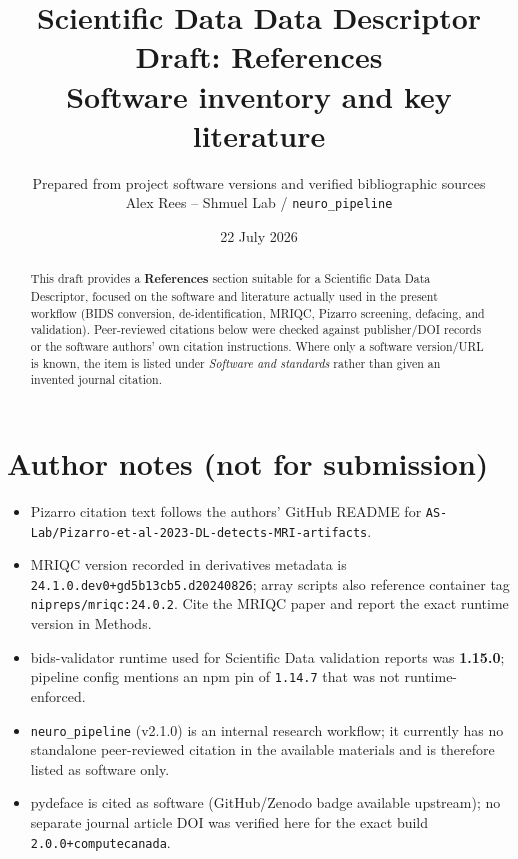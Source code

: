 \documentclass[11pt,letterpaper]{article}
\title{Scientific Data Data Descriptor\\[0.35em]
\large Draft: References\\[0.2em]
\large Software inventory and key literature}
\author{Prepared from project software versions and verified bibliographic sources\\
\small Alex Rees -- Shmuel Lab / \texttt{neuro\_pipeline}}
\date{22 July 2026}
\begin{document}
\maketitle

\begin{abstract}
\noindent
This draft provides a \textbf{References} section suitable for a Scientific Data
Data Descriptor, focused on the software and literature actually used in the
present workflow (BIDS conversion, de-identification, MRIQC, Pizarro screening,
defacing, and validation).
Peer-reviewed citations below were checked against publisher/DOI records or
the software authors' own citation instructions.
Where only a software version/URL is known, the item is listed under
\textit{Software and standards} rather than given an invented journal citation.
\end{abstract}

\tableofcontents
\newpage

\section*{Author notes (not for submission)}

\begin{itemize}[leftmargin=*]
  \item Pizarro citation text follows the authors' GitHub README for
        \texttt{AS-Lab/Pizarro-et-al-2023-DL-detects-MRI-artifacts}.
  \item MRIQC version recorded in derivatives metadata is
        \texttt{24.1.0.dev0+gd5b13cb5.d20240826}; array scripts also reference
        container tag \texttt{nipreps/mriqc:24.0.2}. Cite the MRIQC paper and
        report the exact runtime version in Methods.
  \item bids-validator runtime used for Scientific Data validation reports was
        \textbf{1.15.0}; pipeline config mentions an npm pin of \texttt{1.14.7}
        that was not runtime-enforced.
  \item \texttt{neuro\_pipeline} (v2.1.0) is an internal research workflow; it
        currently has no standalone peer-reviewed citation in the available
        materials and is therefore listed as software only.
  \item pydeface is cited as software (GitHub/Zenodo badge available upstream);
        no separate journal article DOI was verified here for the exact build
        \texttt{2.0.0+computecanada}.
\end{itemize}
\end{document}
